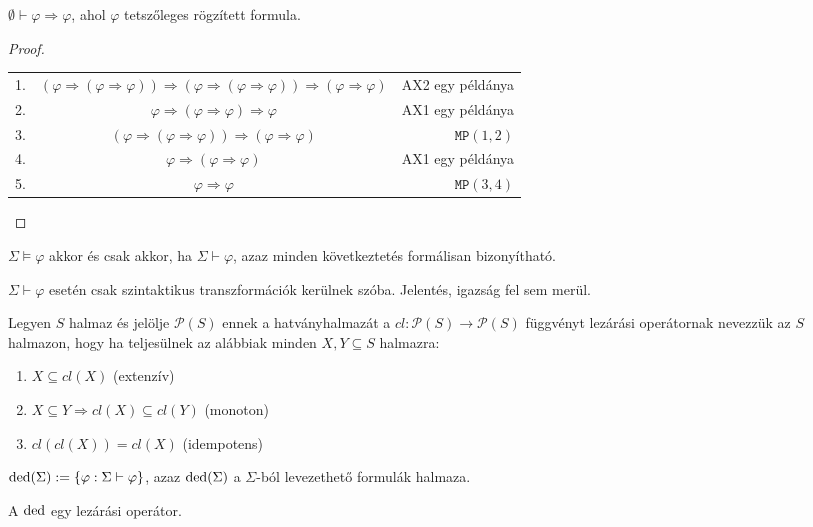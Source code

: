 \begin{exmpl} $\emptyset \vdash \varphi \Rightarrow \varphi$, ahol $\varphi$ tetszőleges rögzített formula.
\begin{proof}
\begin{tabular}{ l c r }
  1. & $(\varphi \Rightarrow (\varphi \Rightarrow \varphi)) \Rightarrow (\varphi \Rightarrow (\varphi \Rightarrow \varphi)) \Rightarrow (\varphi \Rightarrow \varphi)$ &  AX2 egy példánya \\
  2. & $\varphi \Rightarrow (\varphi \Rightarrow \varphi) \Rightarrow \varphi$ & AX1 egy példánya \\
  3. &  $(\varphi \Rightarrow (\varphi \Rightarrow \varphi)) \Rightarrow (\varphi \Rightarrow \varphi)$ & $\texttt{MP}(1,2)$ \\
  4. & $\varphi \Rightarrow (\varphi \Rightarrow \varphi)$ & AX1 egy példánya \\
  5. &  $\varphi \Rightarrow \varphi$ & $\texttt{MP}(3,4)$
\end{tabular}
\end{proof}
\end{exmpl}
\begin{theo}
$\Sigma \models \varphi$ akkor és csak akkor, ha $\Sigma \vdash \varphi$, azaz minden következtetés formálisan bizonyítható.
\end{theo}
\begin{megj} $\Sigma \vdash \varphi$ esetén csak szintaktikus transzformációk kerülnek szóba. Jelentés, igazság fel sem merül.
\end{megj}
\begin{defi} Legyen $S$ halmaz és jelölje $\mathcal{P}(S)$ ennek a hatványhalmazát a $cl : \mathcal{P}(S) \rightarrow \mathcal{P}(S)$ függvényt lezárási operátornak nevezzük az $S$ halmazon, hogy ha teljesülnek az alábbiak minden $X, Y \subseteq S$ halmazra:
\begin{enumerate}
\item $X \subseteq cl(X)$ (extenzív)
\item $X \subseteq Y \Rightarrow cl(X) \subseteq cl(Y)$ (monoton)
\item $cl(cl(X))=cl(X)$ (idempotens)
\end{enumerate}
\end{defi}
\begin{defi} $\mathop{\mathrm{ded}}(\Sigma) := \lbrace \varphi : \Sigma \vdash \varphi \rbrace$, azaz $\mathop{\mathrm{ded}}(\Sigma)$ a $\Sigma$-ból levezethető formulák halmaza.
\end{defi}
\begin{lem} A $\mathop{\mathrm{ded}}$ egy lezárási operátor.
\end{lem}
